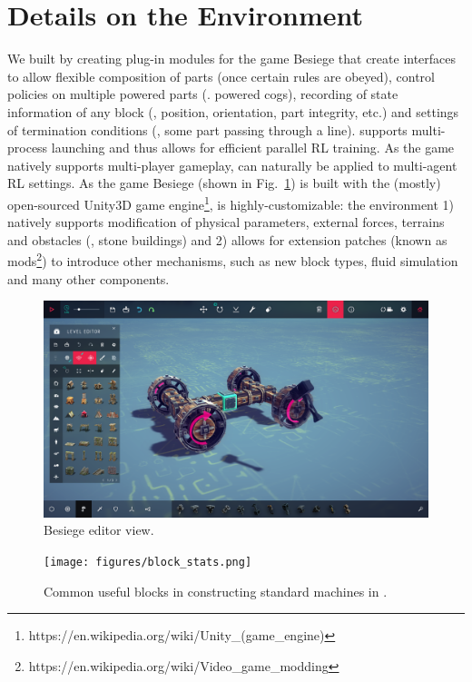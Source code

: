 \clearpage
\pagebreak
\newpage
\section{Details on the \envname Environment} \label{appendix:env}

We built \envname by creating plug-in modules for the game Besiege that create interfaces to allow flexible composition of parts (once certain rules are obeyed), control policies on multiple powered parts (\eg. powered cogs), recording of state information of any block (\eg, position, orientation, part integrity, etc.) and settings of termination conditions (\eg, some part passing through a line). \envname supports multi-process launching and thus allows for efficient parallel RL training. As the game natively supports multi-player gameplay, \envname can naturally be applied to multi-agent RL settings. As the game Besiege (shown in Fig.~\ref{fig:game_editor_view}) is built with the (mostly) open-sourced Unity3D game engine\footnote{https://en.wikipedia.org/wiki/Unity\_(game\_engine)}, \envname is highly-customizable: the environment 1) natively supports modification of physical parameters, external forces, terrains and obstacles (\eg, stone buildings) and 2) allows for extension patches (known as mods\footnote{https://en.wikipedia.org/wiki/Video\_game\_modding}) to introduce other mechanisms, such as new block types, fluid simulation and many other components.



\begin{figure}[h!]
  \centering
  \includegraphics[width=0.9\linewidth]{figures/game_editor_view.png}
  \caption{\footnotesize Besiege editor view.}
  \label{fig:game_editor_view}
\end{figure}

\begin{figure}[h!]
  \centering
  \texttt{[image: figures/block\_stats.png]}
  \caption{\footnotesize Common useful blocks in constructing standard machines in \envname.}
  \label{fig:block_intro}
\end{figure}

